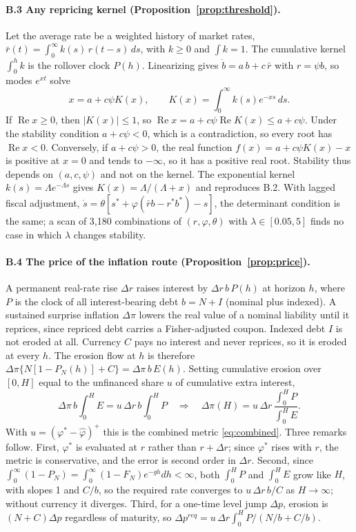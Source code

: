 \paragraph{B.3 Any repricing kernel (Proposition~\ref{prop:threshold}).} Let the average rate be a weighted history of market rates, $\bar r(t)=\int_0^\infty k(s)\,r(t-s)\,ds$, with $k\ge0$ and $\int k=1$. The cumulative kernel $\int_0^h k$ is the rollover clock $P(h)$. Linearizing gives $\dot b=a\,b+c\,\bar r$ with $r=\psi b$, so modes $e^{xt}$ solve
\begin{equation}
x=a+c\psi K(x),\qquad K(x)=\int_0^\infty k(s)e^{-xs}\,ds.
\end{equation}
If $\operatorname{Re}x\ge0$, then $|K(x)|\le1$, so $\operatorname{Re}x=a+c\psi\operatorname{Re}K(x)\le a+c\psi$. Under the stability condition $a+c\psi<0$, which is a contradiction, so every root has $\operatorname{Re}x<0$. Conversely, if $a+c\psi>0$, the real function $f(x)=a+c\psi K(x)-x$ is positive at $x=0$ and tends to $-\infty$, so it has a positive real root. Stability thus depends on $(a,c,\psi)$ and not on the kernel. The exponential kernel $k(s)=\Lambda e^{-\Lambda s}$ gives $K(x)=\Lambda/(\Lambda+x)$ and reproduces B.2. With lagged fiscal adjustment, $\dot s=\theta[s^*+\varphi(\bar r b-r^*b^*)-s]$, the determinant condition is the same; a scan of 3,180 combinations of $(r,\varphi,\theta)$ with $\lambda\in[0.05,5]$ finds no case in which $\lambda$ changes stability.

\paragraph{B.4 The price of the inflation route (Proposition~\ref{prop:price}).} A permanent real-rate rise $\Delta r$ raises interest by $\Delta r\,b\,P(h)$ at horizon $h$, where $P$ is the clock of all interest-bearing debt $b=N+I$ (nominal plus indexed). A sustained surprise inflation $\Delta\pi$ lowers the real value of a nominal liability until it reprices, since repriced debt carries a Fisher-adjusted coupon. Indexed debt $I$ is not eroded at all. Currency $C$ pays no interest and never reprices, so it is eroded at every $h$. The erosion flow at $h$ is therefore $\Delta\pi\{N[1-P_N(h)]+C\}=\Delta\pi\,b\,E(h)$. Setting cumulative erosion over $[0,H]$ equal to the unfinanced share $u$ of cumulative extra interest,
\begin{equation}
\Delta\pi\,b\int_0^H E=u\,\Delta r\,b\int_0^H P\quad\Rightarrow\quad \Delta\pi(H)=u\,\Delta r\,\frac{\int_0^H P}{\int_0^H E}.
\end{equation}
With $u=(\varphi^*-\hat\varphi)^+$ this is the combined metric \eqref{eq:combined}. Three remarks follow. First, $\varphi^*$ is evaluated at $r$ rather than $r+\Delta r$; since $\varphi^*$ rises with $r$, the metric is conservative, and the error is second order in $\Delta r$. Second, since $\int_0^\infty(1-P_N)=\int_0^\infty(1-F_N)e^{-gh}dh<\infty$, both $\int_0^H P$ and $\int_0^H E$ grow like $H$, with slopes 1 and $C/b$, so the required rate converges to $u\,\Delta r\,b/C$ as $H\to\infty$; without currency it diverges. Third, for a one-time level jump $\Delta p$, erosion is $(N+C)\Delta p$ regardless of maturity, so $\Delta p^{req}=u\,\Delta r\int_0^H P/(N/b+C/b)$.

